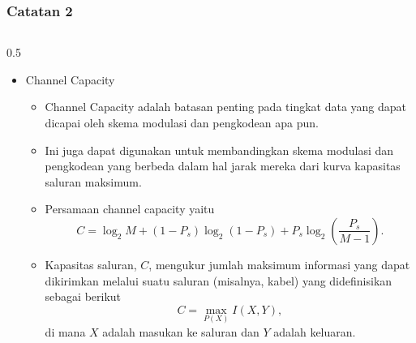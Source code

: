 \begin{frame}
    \frametitle{Catatan 2}
       \vspace*{-0.5cm}
  \begin{columns}[T]
  \small
    \begin{column}{0.5\textwidth}
        \begin{itemize}
            \item Channel Capacity\cite{djordjevic2019physical}\\
                \begin{itemize}
                \tiny \justifying                
                    \item[$\Rightarrow$] Channel Capacity adalah batasan penting pada tingkat data yang dapat dicapai oleh skema modulasi dan pengkodean apa pun. 
                    \item[$\Rightarrow$]  Ini juga dapat digunakan untuk membandingkan skema modulasi dan pengkodean yang berbeda dalam hal jarak mereka dari kurva kapasitas saluran maksimum. 
                    \item[$\Rightarrow$] Persamaan channel capacity yaitu 
                        \begin{equation}
                            C = \log_2 M + (1 - P_s) \log_2(1 - P_s) + P_s \log_2\left(\frac{P_s}{M - 1}\right).
                        \end{equation}
                    \item[$\Rightarrow$] Kapasitas saluran, \( C \), mengukur jumlah maksimum informasi yang dapat dikirimkan melalui suatu saluran (misalnya, kabel) yang didefinisikan sebagai berikut
                    \begin{equation}
                        C = \max_{P(X)} I(X, Y),
                    \end{equation}
                    di mana \( X \) adalah masukan ke saluran dan \( Y \) adalah keluaran.

                \end{itemize}
        \end{itemize}
    \end{column}


\end{columns}
\end{frame}
